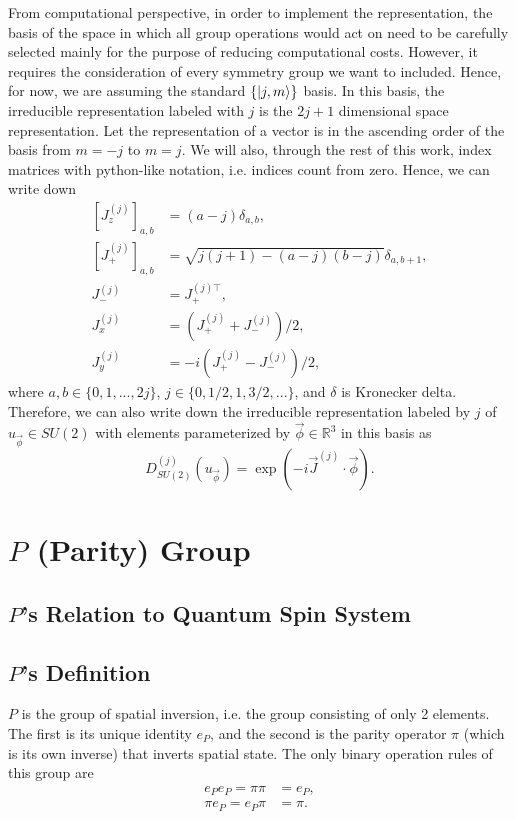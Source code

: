 \documentclass[preprint, 12pt]{revtex4-2}
\numberwithin{equation}{section}
\begin{document}
From computational perspective, in order to implement the representation, the basis of the space in which all group operations would act on need to be carefully selected mainly for the purpose of reducing computational costs. However, it requires the consideration of every symmetry group we want to included. Hence, for now, we are assuming the standard $\{\ket{j, m}\}$ basis. In this basis, the irreducible representation labeled with $j$ is the $2j+1$ dimensional space representation. Let the representation of a vector is in the ascending order of the basis from $m = -j$ to $m = j$. We will also, through the rest of this work, index matrices with python-like notation, i.e. indices count from zero. Hence, we can write down
\begin{equation}\label{eq:J's standard basis}
    \begin{aligned}
        \left[J_z^{(j)}\right]_{a,b} &= (a-j)\delta_{a, b}, \\
        \left[J_+^{(j)}\right]_{a,b} &= \sqrt{j(j+1)-(a-j)(b-j)}\delta_{a,b+1}, \\
        J_-^{(j)} &= J_+^{(j)\top}, \\
        J_x^{(j)} &= \left(J_+^{(j)}+J_-^{(j)}\right)/2, \\
        J_y^{(j)} &= -i\left(J_+^{(j)}-J_-^{(j)}\right)/2,
    \end{aligned}
\end{equation}
where $a, b\in \{0, 1, ..., 2j\}$, $j\in \{0, 1/2, 1, 3/2, ...\}$, and $\delta$ is Kronecker delta. Therefore, we can also write down the irreducible representation labeled by $j$ of $u_{\vec{\phi}}\in SU(2)$ with elements parameterized by $\vec{\phi}\in\mathbb{R}^3$ in this basis as
\begin{equation}\label{eq:SU2 Irreps}
    D^{(j)}_{SU(2)}(u_{\vec{\phi}}) = \exp(-i\vec{J}^{(j)}\cdot\vec{\phi}).
\end{equation}

\newpage
\section{$P$ (Parity) Group}

\subsection{$P$'s Relation to Quantum Spin System}

\subsection{$P$'s Definition}
$P$ is the group of spatial inversion, i.e. the group consisting of only 2 elements. The first is its unique identity $e_P$, and the second is the parity operator $\pi$ (which is its own inverse) that inverts spatial state. The only binary operation rules of this group are
\begin{equation}\label{eq:P binary operations}
    \begin{aligned}
        e_Pe_P = \pi\pi &= e_P, \\
        \pi e_P = e_P \pi &= \pi.
    \end{aligned}
\end{equation}
\end{document}
